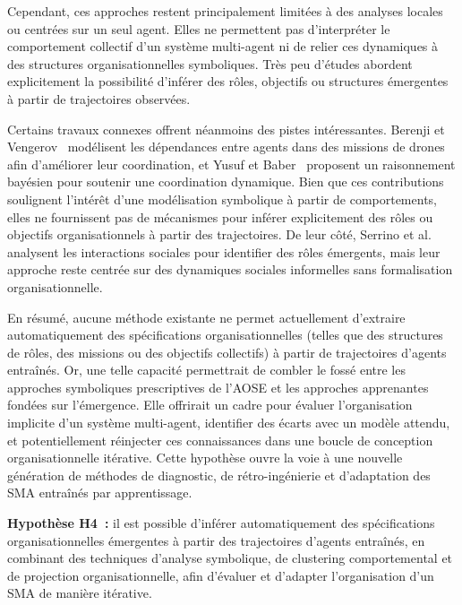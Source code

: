 Cependant, ces approches restent principalement limitées à des analyses locales ou centrées sur un seul agent. Elles ne permettent pas d'interpréter le comportement collectif d'un système multi-agent ni de relier ces dynamiques à des structures organisationnelles symboliques. Très peu d'études abordent explicitement la possibilité d'inférer des rôles, objectifs ou structures émergentes à partir de trajectoires observées.

Certains travaux connexes offrent néanmoins des pistes intéressantes. Berenji et Vengerov~\cite{berenji2000learning} modélisent les dépendances entre agents dans des missions de drones afin d'améliorer leur coordination, et Yusuf et Baber~\cite{yusuf2020inferential} proposent un raisonnement bayésien pour soutenir une coordination dynamique. Bien que ces contributions soulignent l'intérêt d'une modélisation symbolique à partir de comportements, elles ne fournissent pas de mécanismes pour inférer explicitement des rôles ou objectifs organisationnels à partir des trajectoires. De leur côté, Serrino et al.~\cite{serrino2019finding} analysent les interactions sociales pour identifier des rôles émergents, mais leur approche reste centrée sur des dynamiques sociales informelles sans formalisation organisationnelle.

En résumé, aucune méthode existante ne permet actuellement d'extraire automatiquement des spécifications organisationnelles (telles que des structures de rôles, des missions ou des objectifs collectifs) à partir de trajectoires d'agents entraînés. Or, une telle capacité permettrait de combler le fossé entre les approches symboliques prescriptives de l'\ac{AOSE} et les approches apprenantes fondées sur l'émergence. Elle offrirait un cadre pour évaluer l'organisation implicite d'un système multi-agent, identifier des écarts avec un modèle attendu, et potentiellement réinjecter ces connaissances dans une boucle de conception organisationnelle itérative. Cette hypothèse ouvre la voie à une nouvelle génération de méthodes de diagnostic, de rétro-ingénierie et d'adaptation des \ac{SMA} entraînés par apprentissage.

\medskip

\noindent
\textbf{Hypothèse H4~:} il est possible d'inférer automatiquement des spécifications organisationnelles émergentes à partir des trajectoires d'agents entraînés, en combinant des techniques d'analyse symbolique, de clustering comportemental et de projection organisationnelle, afin d'évaluer et d'adapter l'organisation d'un \ac{SMA} de manière itérative.


